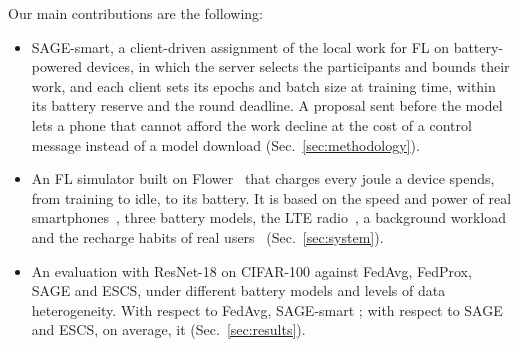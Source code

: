 Our main contributions are the following:
\begin{itemize}
  \item SAGE-smart, a client-driven assignment of the local work for FL on
  battery-powered devices, in which the server selects the participants and
  bounds their work, and each client sets its epochs and batch size at training
  time, within its battery reserve and the round deadline. A proposal sent
  before the model lets a phone that cannot afford the work decline at the cost
  of a control message instead of a model download
  (Sec.~\ref{sec:methodology}).
  \item An FL simulator built on Flower~\cite{beutel2020flower} that charges
  every joule a device spends, from training to idle, to its battery. It is
  based on the speed and power of real smartphones~\cite{xu2022mandheling},
  three battery models, the LTE radio~\cite{huang2012lte,narayanan2021variegated},
  a background workload and the recharge habits of real
  users~\cite{ferreira2011battery} (Sec.~\ref{sec:system}).
  \item An evaluation with ResNet-18 on CIFAR-100 against FedAvg, FedProx,
  SAGE and ESCS, under different battery models and levels of data
  heterogeneity. With respect to FedAvg, SAGE-smart ; with
  respect to SAGE and ESCS, on average, it  (Sec.~\ref{sec:results}). 
\end{itemize}
